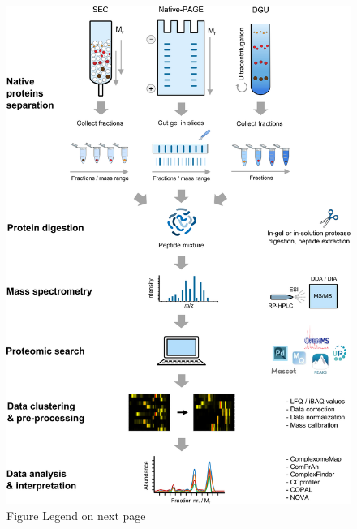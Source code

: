 \begin{figure}[hb!]
    \center
    \includegraphics[width=0.9 \textwidth]{Chapter.1/Figures/Figure5.png}
    \caption{Figure Legend on next page}
    \label{fig:fig5}
\end{figure}
\addtocounter{figure}{-1}
